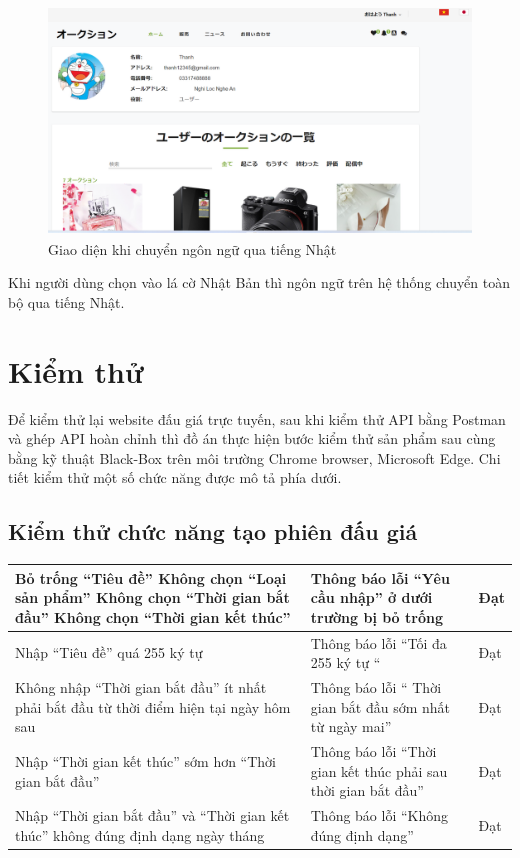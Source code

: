 \documentclass[../DoAn.tex]{subfiles}
\begin{document}
\begin{figure}[H]
    \centering
    \includegraphics[width=11.4cm,height=6.06cm]{Hinhve/jp.png}
    \caption{Giao diện khi chuyển ngôn ngữ qua tiếng Nhật}
    \label{fig:Fig421}
\end{figure}
Khi người dùng chọn vào lá cờ Nhật Bản thì ngôn ngữ trên hệ thống chuyển toàn bộ qua tiếng Nhật.
\section{Kiểm thử}
Để kiểm thử lại website đấu giá trực tuyến, sau khi kiểm thử API bằng Postman và ghép API hoàn chỉnh thì đồ án thực hiện bước kiểm thử sản phẩm sau cùng bằng kỹ thuật Black-Box trên môi trường Chrome browser, Microsoft Edge. Chi tiết kiểm thử một số chức năng được mô tả phía dưới. 
\subsection{Kiểm thử chức năng tạo phiên đấu giá}
    \tabletail{\hline}
    \label{bang413}
    \begin{supertabular}{| p{.45\textwidth}|p{.30\textwidth}|p{.15\textwidth}|} 
    \hline
        Bỏ trống “Tiêu đề”
        Không chọn “Loại sản phẩm”
        Không chọn “Thời gian bắt đầu”
        Không chọn  “Thời gian kết thúc”
        & Thông báo lỗi “Yêu cầu nhập” ở dưới trường bị bỏ trống&Đạt \\\hline
        Nhập “Tiêu đề” quá 255 ký tự
        & Thông báo lỗi “Tối đa 255 ký tự “&Đạt \\\hline
        Không nhập “Thời gian bắt đầu”  ít nhất phải bắt đầu từ thời điểm hiện tại ngày hôm sau
        & Thông báo lỗi “ Thời gian bắt đầu sớm nhất từ ngày mai”&Đạt \\\hline
        Nhập “Thời gian kết thúc” sớm hơn “Thời gian bắt đầu”
        & Thông báo lỗi “Thời gian kết thúc phải sau thời gian bắt đầu”&Đạt \\\hline
        Nhập “Thời gian bắt đầu” và “Thời gian kết thúc” không đúng định dạng ngày tháng
        & Thông báo lỗi “Không đúng định dạng”&Đạt \\\hline
    \end{supertabular}
\end{document}
